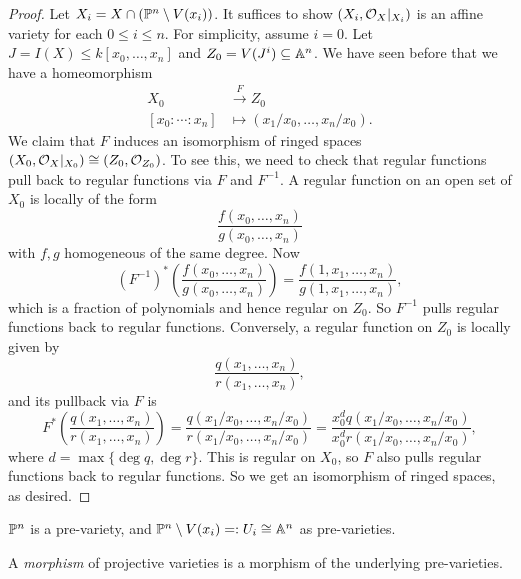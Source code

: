 \begin{proof}
  Let $X_i = X \cap (\mathbb{P}^n \setminus V(x_i))$.
  It suffices to show
  $(X_i, \mathcal{O}_X|_{X_i})$ is an affine
  variety for each $0 \le i \le n$.
  For simplicity, assume $i = 0$.
  Let $J = I(X) \le k[x_0, \dots, x_n]$
  and $Z_0 = V(J^i) \subseteq \mathbb{A}^n$.
  We have seen before that we have
  a homeomorphism
  \begin{align*}
    X_0 &\overset{F}{\longrightarrow} Z_0 \\
    [x_0 : \cdots : x_n]
        &\longmapsto (x_1 / x_0, \dots, x_n / x_0).
  \end{align*}
  We claim that $F$ induces an
  isomorphism of ringed spaces
  $(X_0, \mathcal{O}_X|_{X_0}) \cong (Z_0, \mathcal{O}_{Z_0})$.
  To see this, we need to check
  that regular functions pull back to
  regular functions via $F$ and
  $F^{-1}$. A regular function on an
  open set of $X_0$ is locally of
  the form
  \[
    \frac{f(x_0, \dots, x_n)}{g(x_0, \dots, x_n)}
  \]
  with $f, g$ homogeneous of the
  same degree. Now
  \[
    (F^{-1})^*
    \left(\frac{f(x_0, \dots, x_n)}{g(x_0, \dots, x_n)}\right)
    = \frac{f(1, x_1, \dots, x_n)}{g(1, x_1, \dots, x_n)},
  \]
  which is a fraction of polynomials
  and hence regular on $Z_0$.
  So $F^{-1}$ pulls regular functions
  back to regular functions. Conversely,
  a regular function on
  $Z_0$ is locally given by
  \[
    \frac{q(x_1, \dots, x_n)}{r(x_1, \dots, x_n)},
  \]
  and its pullback via $F$ is
  \[
    F^*\left(\frac{q(x_1, \dots, x_n)}{r(x_1, \dots, x_n)}\right)
    = \frac{q(x_1 / x_0, \dots, x_n / x_0)}{r(x_1 / x_0, \dots, x_n / x_0)}
    = \frac{x_0^d q(x_1 / x_0, \dots, x_n / x_0)}{x_0^d r(x_1 / x_0, \dots, x_n / x_0)},
  \]
  where $d = \max\{\deg q, \deg r\}$.
  This is regular on $X_0$, so
  $F$ also pulls regular functions
  back to regular functions.
  So we get an isomorphism of
  ringed spaces, as desired.
\end{proof}

\begin{example}
  $\mathbb{P}^n$ is a pre-variety, and
  $\mathbb{P}^n \setminus V(x_i) =: U_i \cong \mathbb{A}^n$
  as pre-varieties.
\end{example}

\begin{definition}
  A \emph{morphism}
  of projective varieties
  is a morphism of
  the underlying pre-varieties.
\end{definition}

